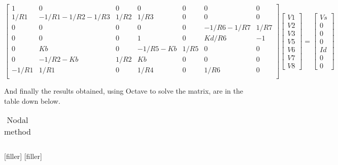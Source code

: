$$
\begin{bmatrix} 
   1     & 0               & 0    & 0           & 0    & 0          & 0    \\
   1/R1  & -1/R1-1/R2-1/R3 & 1/R2 & 1/R3        & 0    & 0          & 0    \\
   0     & 0               & 0    & 0           & 0    & -1/R6-1/R7 & 1/R7 \\
   0     & 0               & 0    & 1           & 0    & Kd/R6      & -1   \\
   0     & Kb              & 0    & -1/R5-Kb    & 1/R5 & 0          & 0    \\
   0     & -1/R2-Kb        & 1/R2 & Kb          & 0    & 0          & 0    \\
   -1/R1 & 1/R1            & 0    & 1/R4        & 0    & 1/R6       & 0    \\
\end {bmatrix} 
\begin{bmatrix}
V1 \\ V2 \\ V3 \\ V5 \\ V6 \\ V7 \\ V8
\end {bmatrix} 
=
\begin{bmatrix} 
Vs \\ 0 \\ 0 \\ 0 \\ Id \\ 0 \\ 0
\end {bmatrix} 
$$ 

\vspace{0.5cm}
And finally the results obtained, using Octave to solve the matrix, are in the table down below. 

\FloatBarrier
\begin{table}[h]
  \centering
  \begin{tabular}{|c|c|c|c|c|c|c|}
    \hline    
    
    \hline
  \end{tabular}
  \caption{Nodal method}
  \label{tab:nodal}
\end{table}
\FloatBarrier


[filler]
[filler]

\begin{align*} 
[filler]
[filler]
\end{align*}

